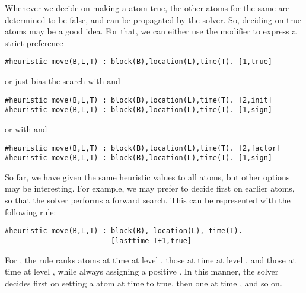 Whenever we decide on making a  atom true,  
the other  atoms for the same  are determined to be false,
and can be propagated by the solver. 
So, deciding on true  atoms may be a good idea.
For that, we can either use the  modifier to express a strict preference
\begin{lstlisting}[basicstyle=\small\ttfamily,numbers=none]
#heuristic move(B,L,T) : block(B),location(L),time(T). [1,true]
\end{lstlisting}
or just bias the search with  and 
\begin{lstlisting}[basicstyle=\small\ttfamily,numbers=none]
#heuristic move(B,L,T) : block(B),location(L),time(T). [2,init]
#heuristic move(B,L,T) : block(B),location(L),time(T). [1,sign]
\end{lstlisting}
or with  and 
\begin{lstlisting}[basicstyle=\small\ttfamily,numbers=none]
#heuristic move(B,L,T) : block(B),location(L),time(T). [2,factor]
#heuristic move(B,L,T) : block(B),location(L),time(T). [1,sign]
\end{lstlisting}

So far, we have given the same heuristic values to all  atoms,
but other options may be interesting. 
For example, we may prefer to decide first on earlier  atoms,
so that the solver performs a forward search. 
This can be represented with the following rule:
\begin{lstlisting}[basicstyle=\small\ttfamily,numbers=none]
#heuristic move(B,L,T) : block(B), location(L), time(T). 
                         [lasttime-T+1,true]
\end{lstlisting}
For ,
the rule ranks  atoms at time  at level ,
those at time  at level , and 
those at time  at level ,
while always assigning a positive .
In this manner, 
the solver decides first on setting a  atom at time  to true, 
then one at time , and so on.

